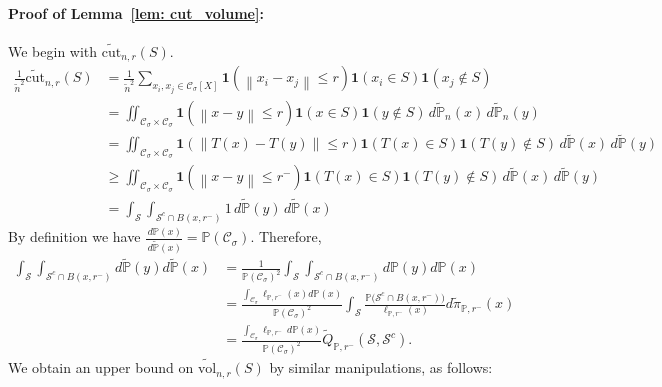 \documentclass[11pt,twoside]{article}
\newcommand{\vol}{\mathrm{vol}}
\newcommand{\cut}{\mathrm{cut}}
\newcommand{\norm}[1]{\left\lVert#1\right\rVert}
\newcommand{\1}{\mathbf{1}}
\newcommand{\Xbf}{X}             %
\newcommand{\Pbb}{\mathbb{P}}
\newcommand{\Sset}{\mathcal{S}}
\newcommand{\Cset}{\mathcal{C}}
\newcommand{\Csig}{\Cset_{\sigma}}
\newcommand{\piwt}{\widetilde{\pi}}
\begin{document}
\paragraph{Proof of Lemma~\ref{lem: cut_volume}: }

We begin with $\widetilde{\cut}_{n,r}(S)$.
\begin{align*}
\frac{1}{\widetilde{n}^2} \widetilde{\cut}_{n,r}(S) & = \frac{1}{ \widetilde{n}^2} \sum_{x_i, x_j \in \Csig[\Xbf]} \1(\norm{x_i - x_j} \leq r) \1(x_i \in S) \1(x_j \not\in S)\\
& = \iint_{\Csig \times \Csig} \1(\norm{x - y} \leq r) \1(x \in S) \1(y \not\in S) \,d\widetilde{\Pbb}_n(x) \,d\widetilde{\Pbb}_n(y) \\
& =  \iint_{\Csig \times \Csig} \1(\norm{T(x) - T(y)} \leq r) \1(T(x) \in S) \1(T(y) \not\in S)\,d\widetilde{\Pbb}(x) \,d\widetilde{\Pbb}(y) \tag{change of variables}  \\
& \geq \iint_{\Csig \times \Csig} \1(\norm{x - y} \leq r^-) \1(T(x) \in S) \1(T(y) \not\in S) \,d\widetilde{\Pbb}(x) \,d\widetilde{\Pbb}(y) \\
& = \int_{\Sset} \int_{\Sset^c \cap B(x,r^-)} 1 \,d\widetilde{\Pbb}(y) \,d\widetilde{\Pbb}(x)
\end{align*}
By definition we have $\frac{\,d\Pbb(x)}{\,d\widetilde{\Pbb}(x)} = \Pbb(\Csig)$. Therefore,
\begin{align}
\int_{\Sset} \int_{\Sset^c \cap B(x,r^-)} d\widetilde{\Pbb}(y) d\widetilde{\Pbb}(x) & = \frac{1}{\Pbb(\Csig)^2} \int_{\Sset} \int_{\Sset^c \cap B(x,r^-)} d\Pbb(y) d\Pbb(x) \nonumber \\
& = \frac{\int_{\Csig} \ell_{\Pbb,r^-}(x) d\Pbb(x)}{\Pbb(\Csig)^2} \int_{\Sset} \frac{\Pbb\bigl(\Sset^c \cap B(x,r^-)\bigr)}{\ell_{\Pbb,r^-}(x)} d\piwt_{\Pbb,r^-}(x) \nonumber \\
& = \frac{\int_{\Csig} \ell_{\Pbb,r^-}\,d\Pbb(x)}{\Pbb(\Csig)^2} \widetilde{Q}_{\Pbb,r^-}(\Sset, \Sset^c). \label{eqn: cut_bound}
\end{align}	
We obtain an upper bound on $\widetilde{\vol}_{n,r}(S)$ by similar manipulations, as follows:
\end{document}
